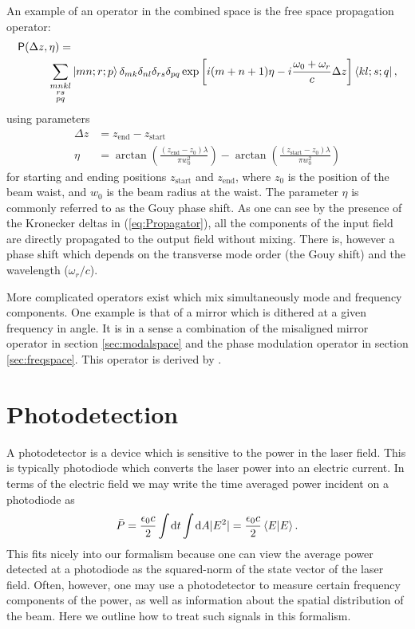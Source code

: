 An example of an operator in the combined space is the free space propagation operator:
\begin{align}
\label{eq:Propagator}
\mathsf{P}(\Delta z,\eta) = & \\
\sum_{\substack{mnkl\\rs\\pq}}& \left| mn;r;p \right>
\delta_{mk}\delta_{nl}\delta_{rs}\delta_{pq}
\exp  \left[i(m+n+1)\eta
-i\frac{\omega_0+\omega_r}{c}\Delta z\right] 
\left< kl;s;q \right|, \notag
\end{align}
using parameters
\begin{align*}
\Delta z &= z_{\text{end}}-z_{\text{start}} \\
\eta &= \arctan \left( \frac{(z_{\text{end}}-z_0)\lambda}{\pi w_0^2}\right)- 
        \arctan \left( \frac{(z_{\text{start}}-z_0)\lambda}{\pi w_0^2}\right)
\end{align*}
for starting and ending positions $z_{\text{start}}$ and $z_{\text{end}}$, where $z_0$ is the position of the beam waist, and $w_0$ is the beam radius at the waist. %
The parameter $\eta$ is commonly referred to as the Gouy phase shift. %
As one can see by the presence of the Kronecker deltas in (\ref{eq:Propagator}), all the components of the input field are directly propagated to the output field without mixing. %
There is, however a phase shift which depends on the transverse mode order (the Gouy shift) and the wavelength ($\omega_r/c$).

More complicated operators exist which mix simultaneously mode and frequency components. %
One example is that of a mirror which is dithered at a given frequency in angle. %
It is in a sense a combination of the misaligned mirror operator in section \ref{sec:modalspace} and the phase modulation operator in section \ref{sec:freqspace}. %
This operator is derived by \citet{Sigg:00}.
\section{Photodetection}
A photodetector is a device which is sensitive to the power in the laser field. %
This is typically photodiode which converts the laser power into an electric current. %
In terms of the electric field we may write the time averaged power incident on a photodiode as
\begin{equation}
\bar{P}=\frac{\epsilon_0 c}{2}\int \! \! \dd t \int \! \! \dd A|E^2|=\frac{\epsilon_0 c}{2}\inprod{E}{E}.
\end{equation}
This fits nicely into our formalism because one can view the average power detected at a photodiode as the squared-norm of the state vector of the laser field. %
Often, however, one may use a photodetector to measure certain frequency components of the power, as well as information about the spatial distribution of the beam. %
Here we outline how to treat such signals in this formalism.

